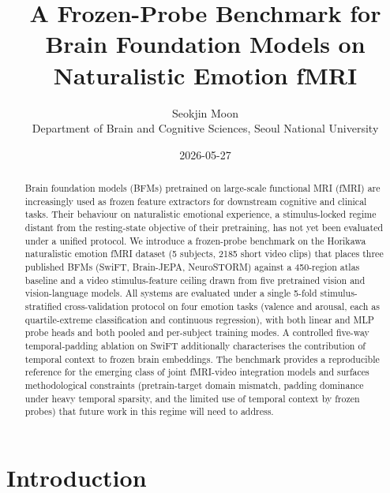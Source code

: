 \documentclass[11pt, a4paper]{article}
\title{\vspace{-2em}\textbf{A Frozen-Probe Benchmark for Brain Foundation Models on
       Naturalistic Emotion fMRI}}
\author{Seokjin Moon \\
        \small Department of Brain and Cognitive Sciences, Seoul National University}
\date{2026-05-27}
\begin{document}
\maketitle
\thispagestyle{fancy}

\begin{abstract}
\noindent
Brain foundation models (BFMs) pretrained on large-scale functional MRI (fMRI) are
increasingly used as frozen feature extractors for downstream cognitive and clinical
tasks. Their behaviour on naturalistic emotional experience, a stimulus-locked regime
distant from the resting-state objective of their pretraining, has not yet been evaluated
under a unified protocol. We introduce a frozen-probe benchmark on the Horikawa
naturalistic emotion fMRI dataset (5 subjects, 2185 short video clips) that places three
published BFMs (SwiFT, Brain-JEPA, NeuroSTORM) against a 450-region atlas baseline and a
video stimulus-feature ceiling drawn from five pretrained vision and vision-language
models. All systems are evaluated under a single 5-fold stimulus-stratified
cross-validation protocol on four emotion tasks (valence and arousal, each as
quartile-extreme classification and continuous regression), with both linear and MLP
probe heads and both pooled and per-subject training modes. A controlled five-way
temporal-padding ablation on SwiFT additionally characterises the contribution of
temporal context to frozen brain embeddings. The benchmark provides a reproducible
reference for the emerging class of joint fMRI-video integration models and surfaces
methodological constraints (pretrain-target domain mismatch, padding dominance under
heavy temporal sparsity, and the limited use of temporal context by frozen probes) that
future work in this regime will need to address.
\end{abstract}

\section{Introduction}
\end{document}
